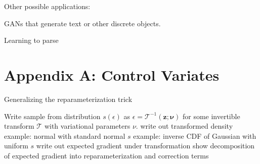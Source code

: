 \documentclass{article}
\begin{document}
Other possible applications:

GANs \citep{goodfellow2014generative} that generate text or other discrete objects.

Learning to parse \citep{kusner2017grammar}








\section{Appendix A: Control Variates}







\par{Generalizing the reparameterization trick}

Write sample from distribution $s(\epsilon)$ as $\epsilon = \mathcal{T}^{-1}(\mathbf{z}; \mathbf{\nu})$ for some invertible transform $\mathcal{T}$ with variational parameters $\nu$.
write out transformed density
example: normal with standard normal $s$
example: inverse CDF of Gaussian with uniform $s$
write out expected gradient under transformation
show decomposition of expected gradient into reparameterization and correction terms 
\end{document}
